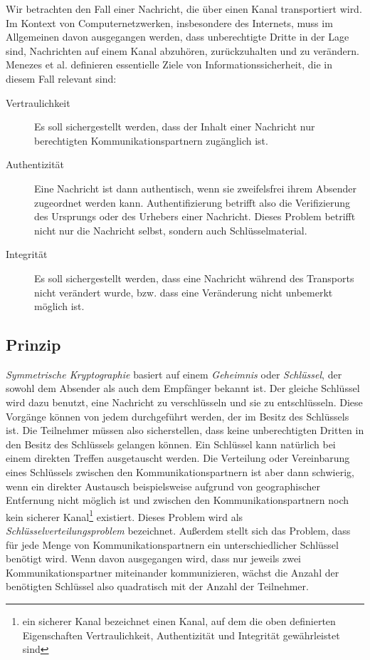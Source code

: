 Wir betrachten den Fall einer Nachricht, die über einen Kanal
transportiert wird. Im Kontext von Computernetzwerken, insbesondere
des Internets, muss im Allgemeinen davon ausgegangen werden, dass
unberechtigte Dritte in der Lage sind, Nachrichten auf einem Kanal
abzuhören, zurückzuhalten und zu verändern. Menezes et
al. \cite{Menezes1996} definieren essentielle Ziele von
Informationssicherheit, die in diesem Fall relevant sind:

\begin{description}
\item[Vertraulichkeit] Es soll sichergestellt werden, dass der Inhalt
  einer Nachricht nur berechtigten Kommunikationspartnern zugänglich
  ist.
\item[Authentizität] Eine Nachricht ist dann authentisch, wenn sie
  zweifelsfrei ihrem Absender zugeordnet werden
  kann. Authentifizierung betrifft also die Verifizierung des
  Ursprungs oder des Urhebers einer Nachricht. Dieses Problem betrifft
  nicht nur die Nachricht selbst, sondern auch Schlüsselmaterial.
\item[Integrität] Es soll sichergestellt werden, dass eine Nachricht
  während des Transports nicht verändert wurde, bzw. dass eine
  Veränderung nicht unbemerkt möglich ist.
\end{description}

\subsection{Prinzip}
\label{ch:Grundlagen:sec:PublicKeyCrypto:subsec:Prinzip}

\emph{Symmetrische Kryptographie} basiert auf einem \emph{Geheimnis}
oder \emph{Schlüssel}, der sowohl dem Absender als auch dem
Empfänger bekannt ist. Der gleiche Schlüssel wird dazu benutzt,
eine Nachricht zu verschlüsseln und sie zu entschlüsseln. Diese
Vorgänge können von jedem durchgeführt werden, der im Besitz des
Schlüssels ist.  Die Teilnehmer müssen also sicherstellen, dass
keine unberechtigten Dritten in den Besitz des Schlüssels gelangen
können. Ein Schlüssel kann natürlich bei einem direkten Treffen
ausgetauscht werden. Die Verteilung oder Vereinbarung eines
Schlüssels zwischen den Kommunikationspartnern ist aber dann
schwierig, wenn ein direkter Austausch beispielsweise aufgrund von
geographischer Entfernung nicht möglich ist und zwischen den
Kommunikationspartnern noch kein sicherer Kanal\footnote{ein sicherer
  Kanal bezeichnet einen Kanal, auf dem die oben definierten
  Eigenschaften Vertraulichkeit, Authentizität und Integrität
  gewährleistet sind} existiert. Dieses Problem wird als
\emph{Schlüsselverteilungsproblem} bezeichnet\cite{Menezes1996}.
Außerdem stellt sich das Problem, dass für jede Menge von
Kommunikationspartnern ein unterschiedlicher Schlüssel benötigt
wird. Wenn davon ausgegangen wird, dass nur jeweils zwei
Kommunikationspartner miteinander kommunizieren, wächst die Anzahl
der benötigten Schlüssel also quadratisch mit der Anzahl der
Teilnehmer.

